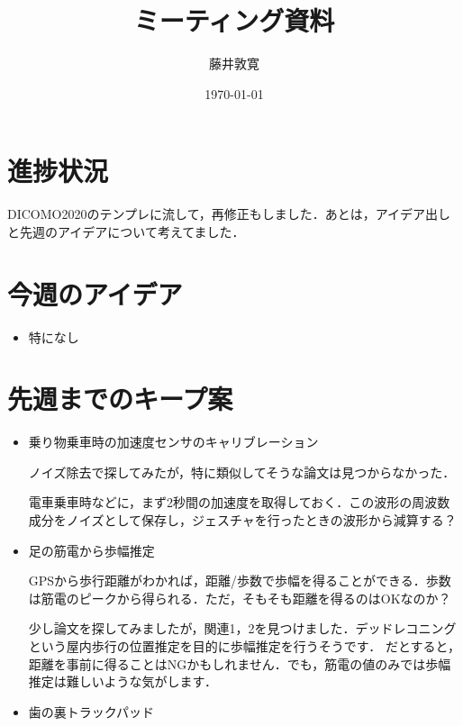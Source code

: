 \documentclass[a4j,twocolumn,10pt]{jarticle}
\title{ミーティング資料}
\author{藤井敦寛}
\date{\today}
\begin{document}
\maketitle

\section{進捗状況}
DICOMO2020のテンプレに流して，再修正もしました．あとは，アイデア出しと先週のアイデアについて考えてました．

\section{今週のアイデア}
\begin{itemize}
  \item 特になし
\end{itemize}

\section{先週までのキープ案}
\begin{itemize}
  \item 乗り物乗車時の加速度センサのキャリブレーション

  ノイズ除去で探してみたが，特に類似してそうな論文は見つからなかった．

  電車乗車時などに，まず2秒間の加速度を取得しておく．この波形の周波数成分をノイズとして保存し，ジェスチャを行ったときの波形から減算する？

  \item 足の筋電から歩幅推定

  GPSから歩行距離がわかれば，距離/歩数で歩幅を得ることができる．歩数は筋電のピークから得られる．ただ，そもそも距離を得るのはOKなのか？

  少し論文を探してみましたが，関連1，2を見つけました．デッドレコニングという屋内歩行の位置推定を目的に歩幅推定を行うそうです．
  だとすると，距離を事前に得ることはNGかもしれません．でも，筋電の値のみでは歩幅推定は難しいような気がします．

  \item 歯の裏トラックパッド
\end{itemize}
\end{document}
